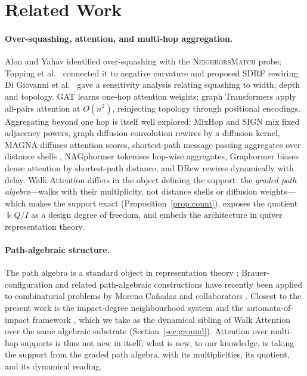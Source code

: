 \documentclass[runningheads]{llncs}
\newcommand{\kk}{\Bbbk}
\newcommand{\kQ}{\kk Q}
\begin{document}
\section{Related Work}\label{sec:related}

\paragraph{Over-squashing, attention, and multi-hop aggregation.}
Alon and Yahav \cite{alon2021bottleneck} identified over-squashing with the
\textsc{NeighborsMatch} probe; Topping et al.\ \cite{topping2022understanding}
connected it to negative curvature and proposed SDRF rewiring; Di Giovanni et
al.\ \cite{digiovanni2023oversquashing} gave a sensitivity analysis relating
squashing to width, depth and topology. GAT \cite{velickovic2017graph} learns
one-hop attention weights; graph Transformers apply all-pairs attention
\cite{vaswani2017attention} at $O(n^2)$, reinjecting topology through
positional encodings. Aggregating beyond one hop is itself well explored:
MixHop \cite{abu2019mixhop} and SIGN \cite{frasca2020sign} mix fixed adjacency
powers, graph diffusion convolution \cite{gasteiger2019diffusion} rewires by a
diffusion kernel, MAGNA \cite{wang2021magna} diffuses attention scores,
shortest-path message passing aggregates over distance shells
\cite{abboud2022shortest}, NAGphormer \cite{chen2023nagphormer} tokenises
hop-wise aggregates, Graphormer \cite{ying2021graphormer} biases dense
attention by shortest-path distance, and DRew \cite{gutteridge2023drew}
rewires dynamically with delay. Walk Attention differs in the object defining
the support: the \emph{graded path algebra}---walks with their multiplicity,
not distance shells or diffusion weights---which makes the support exact
(Proposition~\ref{prop:count}), exposes the quotient $\kQ/I$ as a design degree
of freedom, and embeds the architecture in quiver representation theory.

\paragraph{Path-algebraic structure.}
The path algebra is a standard object in representation theory
\cite{schiffler2014quiver,assem2006elements}; Brauer-configuration and related
path-algebraic constructions have recently been applied to combinatorial
problems by Moreno Ca\~nadas and collaborators
\cite{moreno2021brauer,moreno2024integer}. Closest to the present work is the
impact-degree neighbourhood system and the automata-of-impact framework
\cite{zainea2026aiq,ibanez2025casimulations}, which we take as the dynamical
sibling of Walk Attention over the same algebraic substrate
(Section~\ref{sec:ground}). Attention over multi-hop supports is thus not new
in itself; what is new, to our knowledge, is taking the support from the graded
path algebra, with its multiplicities, its quotient, and its dynamical reading.
\end{document}
